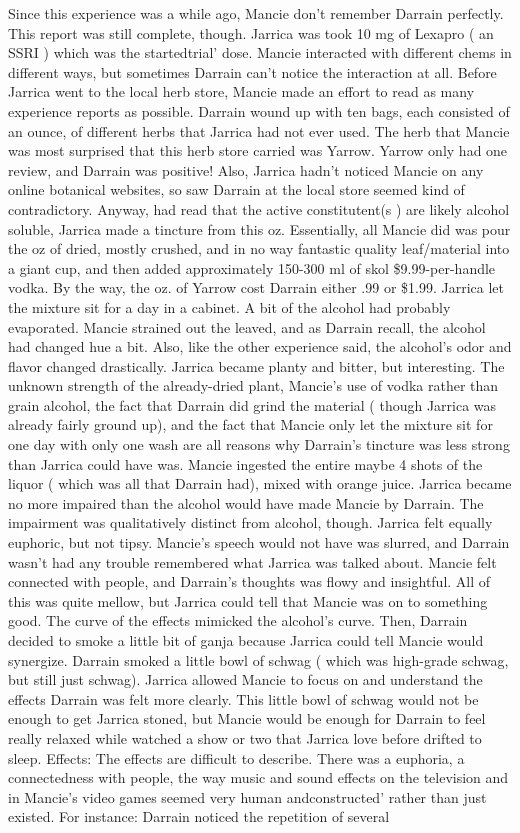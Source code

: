 \documentclass[12pt]{book}
\begin{document}
Since this experience was a while ago, Mancie don't remember Darrain perfectly. This report was still complete, though. Jarrica was took 10 mg of Lexapro ( an SSRI ) which was the startedtrial' dose. Mancie interacted with different chems in different ways, but sometimes Darrain can't notice the interaction at all. Before Jarrica went to the local herb store, Mancie made an effort to read as many experience reports as possible. Darrain wound up with ten bags, each consisted of an ounce, of different herbs that Jarrica had not ever used. The herb that Mancie was most surprised that this herb store carried was Yarrow. Yarrow only had one review, and Darrain was positive! Also, Jarrica hadn't noticed Mancie on any online botanical websites, so saw Darrain at the local store seemed kind of contradictory. Anyway, had read that the active constitutent(s ) are likely alcohol soluble, Jarrica made a tincture from this oz. Essentially, all Mancie did was pour the oz of dried, mostly crushed, and in no way fantastic quality leaf/material into a giant cup, and then added approximately 150-300 ml of skol \$9.99-per-handle vodka. By the way, the oz. of Yarrow cost Darrain either .99 or \$1.99. Jarrica let the mixture sit for a day in a cabinet. A bit of the alcohol had probably evaporated. Mancie strained out the leaved, and as Darrain recall, the alcohol had changed hue a bit. Also, like the other experience said, the alcohol's odor and flavor changed drastically. Jarrica became planty and bitter, but interesting. The unknown strength of the already-dried plant, Mancie's use of vodka rather than grain alcohol, the fact that Darrain did grind the material ( though Jarrica was already fairly ground up), and the fact that Mancie only let the mixture sit for one day with only one wash are all reasons why Darrain's tincture was less strong than Jarrica could have was. Mancie ingested the entire maybe 4 shots of the liquor ( which was all that Darrain had), mixed with orange juice. Jarrica became no more impaired than the alcohol would have made Mancie by Darrain. The impairment was qualitatively distinct from alcohol, though. Jarrica felt equally euphoric, but not tipsy. Mancie's speech would not have was slurred, and Darrain wasn't had any trouble remembered what Jarrica was talked about. Mancie felt connected with people, and Darrain's thoughts was flowy and insightful. All of this was quite mellow, but Jarrica could tell that Mancie was on to something good. The curve of the effects mimicked the alcohol's curve. Then, Darrain decided to smoke a little bit of ganja because Jarrica could tell Mancie would synergize. Darrain smoked a little bowl of schwag ( which was high-grade schwag, but still just schwag). Jarrica allowed Mancie to focus on and understand the effects Darrain was felt more clearly. This little bowl of schwag would not be enough to get Jarrica stoned, but Mancie would be enough for Darrain to feel really relaxed while watched a show or two that Jarrica love before drifted to sleep. Effects: The effects are difficult to describe. There was a euphoria, a connectedness with people, the way music and sound effects on the television and in Mancie's video games seemed very human andconstructed' rather than just existed. For instance: Darrain noticed the repetition of several 
\end{document}
